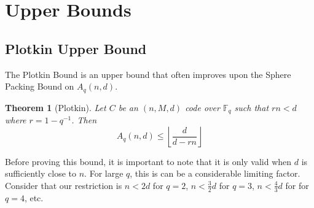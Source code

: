 \documentclass{article}
\newtheorem{theorem}{Theorem}
\numberwithin{theorem}{subsection}
\numberwithin{lemma}{subsection}
\theoremstyle{definition}
\numberwithin{exmp}{subsection}
\theoremstyle{definition}
\numberwithin{defn}{subsection}
\theoremstyle{definition}
\numberwithin{claim}{subsection}
\begin{document}
\section{Upper Bounds}

\subsection{Plotkin Upper Bound}

The Plotkin Bound is an upper bound that often improves upon the Sphere Packing Bound on $A_q(n,d)$.

\begin{theorem}[Plotkin]
Let $C$ be an $(n,M,d)$ code over $\mathbb{F}_q$ such that $rn < d$ where $r = 1 - q^{-1}$.  Then
\begin{equation}
A_q(n,d) \le \left \lfloor \frac{d}{d-rn}\right\rfloor
\end{equation}
\end{theorem}

Before proving this bound, it is important to note that it is only valid when $d$ is sufficiently close to $n$.  For large $q$, this is can be a considerable limiting factor.
Consider that our restriction is $n<2d$ for $q=2$, $n<\frac{3}{2}d$ for $q=3$, $n<\frac{4}{3}d$ for for $q=4$, etc.
\end{document}
